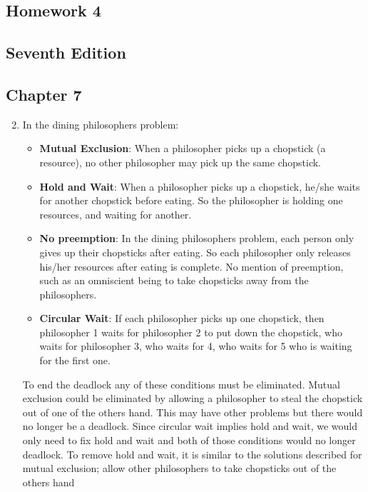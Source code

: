 \documentclass{article}
\begin{document}
\begin{center}
    \section*{Homework 4}
    \subsection*{Seventh Edition}
\end{center}

\subsection*{Chapter 7}
\begin{enumerate}
\setcounter{enumi}{1}
\item In the dining philosophers problem:
\begin{itemize}
\item \textbf{Mutual Exclusion}: When a philosopher picks up a chopstick (a resource), no other philosopher may pick up the same chopstick.
\item \textbf{Hold and Wait}: When a philosopher picks up a chopstick, he/she waits for another chopstick before eating. So the philosopher is holding one resources, and waiting for another.
\item \textbf{No preemption}: In the dining philosophers problem, each person only gives up their chopsticks after eating. So each philosopher only releases his/her resources after eating is complete. No mention of preemption, such as an omniscient being to take chopsticks away from the philosophers.
\item \textbf{Circular Wait}: If each philosopher picks up one chopstick, then philosopher 1 waits for philosopher 2 to put down the chopstick, who waits for philosopher 3, who waits for 4, who waits for 5 who is waiting for the first one.
\end{itemize}
To end the deadlock any of these conditions must be eliminated.
Mutual exclusion could be eliminated by allowing a philosopher to steal the chopstick out of one of the others hand.
This may have other problems but there would no longer be a deadlock.
Since circular wait implies hold and wait, we would only need to fix hold and wait and both of those conditions would no longer deadlock.
To remove hold and wait, it is similar to the solutions described for mutual exclusion; allow other philosophers to take chopsticks out of the others hand

\end{enumerate}
\end{document}
